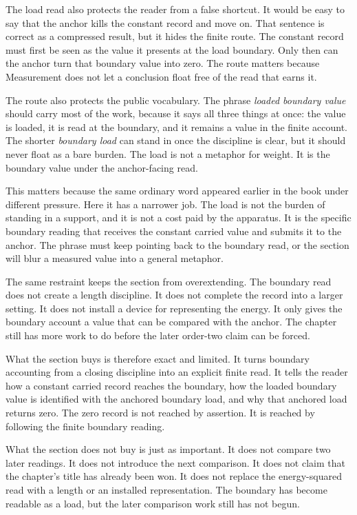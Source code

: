 The load read also protects the reader from a false shortcut. It would be easy
to say that the anchor kills the constant record and move on. That sentence is
correct as a compressed result, but it hides the finite route. The constant
record must first be seen as the value it presents at the load boundary. Only
then can the anchor turn that boundary value into zero. The route matters
because Measurement does not let a conclusion float free of the read that
earns it.

The route also protects the public vocabulary. The phrase \emph{loaded boundary
value} should carry most of the work, because it says all three things at once:
the value is loaded, it is read at the boundary, and it remains a value in the
finite account. The shorter \emph{boundary load} can stand in once the
discipline is clear, but it should never float as a bare burden. The load is
not a metaphor for weight. It is the boundary value under the anchor-facing
read.

This matters because the same ordinary word appeared earlier in the book under
different pressure. Here it has a narrower job. The load is not the burden of
standing in a support, and it is not a cost paid by the apparatus. It is the
specific boundary reading that receives the constant carried value and submits
it to the anchor. The phrase must keep pointing back to the boundary read, or
the section will blur a measured value into a general metaphor.

The same restraint keeps the section from overextending. The boundary read does
not create a length discipline. It does not complete the record into a larger
setting. It does not install a device for representing the energy. It only
gives the boundary account a value that can be compared with the anchor. The
chapter still has more work to do before the later order-two claim can be
forced.

What the section buys is therefore exact and limited. It turns boundary
accounting from a closing discipline into an explicit finite read. It tells the
reader how a constant carried record reaches the boundary, how the loaded
boundary value is identified with the anchored boundary load, and why that
anchored load returns zero. The zero record is not reached by assertion. It is
reached by following the finite boundary reading.

What the section does not buy is just as important. It does not compare two
later readings. It does not introduce the next comparison. It does not claim
that the chapter's title has already been won. It does not replace the
energy-squared read with a length or an installed representation. The boundary
has become readable as a load, but the later comparison work still has not
begun.


